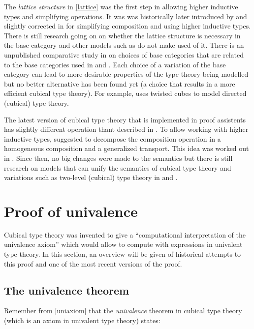 \documentclass[12pt,a4paper,twoside,xetex]{book} %
\newcommand{\keyword}[1]{\emph{#1}\index{#1}}
\begin{document}
The \keyword{lattice structure} in  \cref{lattice} was the first step in allowing higher inductive types and simplifying operations. It was  was historically 
later introduced by \cite{Cohen2016} and slightly corrected in \cite{Huber2016} for simplifying composition and using 
higher inductive types. There is still research going on on whether the lattice structure is necessary in the base category and other models such as \cite{Altenkirch2015} do not make used of it.
There is an unpublished comparative study in \cite{Awodey2016June} on choices of base categories that are related to the base categories used in \cite{Bezem2014} and \cite{Huber2016}. Each choice of a variation of the base category can lead to more desirable properties of the type theory being modelled but no better alternative has been found yet (a choice that results in a more efficient cubical type theory). For example, \cite{Gun2019} uses twisted cubes to model directed (cubical) type theory.

The latest version of cubical type theory that is implemented in proof assistents has slightly different operation thant described in \cite{Huber2016}. To allow working with higher inductive types, \cite{Huber17note} suggested to decompose the composition operation in a homogeneous composition and a generalized transport. This idea was worked out in \cite{Coquand2018}. Since then, no big changes were made to the semantics but there is still research on models that can unify the semantics of cubical type theory and variations such as two-level (cubical) type theory in \cite{Uem19} and \cite{Cavallo2019}. 


\chapter{Proof of univalence}\label{univalenceproof}

Cubical type theory was invented to give a ``computational interpretation of 
the univalence axiom'' which would allow to compute with expressions in 
univalent type theory. In this section, an overview will be given of 
historical attempts to this proof and one of the most recent versions of the 
proof.


\section{The univalence theorem}

Remember from \cref{uniaxiom} that the \keyword{univalence} theorem in cubical 
type theory (which is an axiom in univalent type theory) states:
\end{document}
